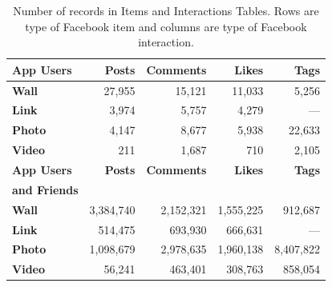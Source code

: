 \begin{table}
\centering
\caption{\small Number of records in Items and Interactions Tables. Rows are type of Facebook item and columns are type of Facebook interaction.}
\label{tab:interactions}
\begin{tabular}{|>{\small}l|>{\small}r|>{\small}r|>{\small}r|>{\small}r|}
\hline
\textbf{App Users} & \textbf{Posts} & \textbf{Comments} & \textbf{Likes} & \textbf{Tags} \\
\hline
\textbf{Wall} & 27,955 & 15,121 & 11,033 & 5,256 \\
\hline
\textbf{Link} & 3,974 & 5,757 & 4,279 & --- \\
\hline
\textbf{Photo} & 4,147 & 8,677 & 5,938 & 22,633 \\
\hline
\textbf{Video} & 211 & 1,687 & 710 & 2,105 \\
\hline
\hline
\textbf{App Users} & \textbf{Posts} & \textbf{Comments} & \textbf{Likes} & \textbf{Tags} \\
\textbf{and Friends} & & & & \\
\hline
\textbf{Wall} & 3,384,740 & 2,152,321 & 1,555,225 & 912,687 \\
\hline
\textbf{Link} & 514,475 & 693,930 & 666,631 & --- \\
\hline
\textbf{Photo} & 1,098,679 & 2,978,635 & 1,960,138 & 8,407,822 \\
\hline
\textbf{Video} & 56,241 & 463,401 & 308,763 & 858,054 \\
\hline
\end{tabular}
\end{table}




